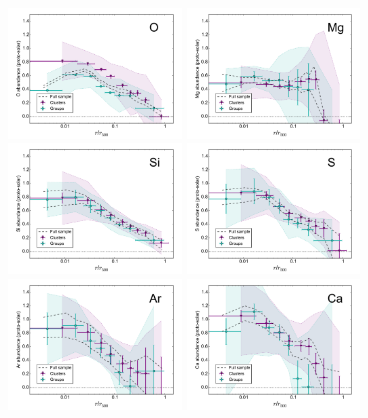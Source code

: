 \documentclass{aa}
\begin{document}
\begin{figure}[!]
        \centering
                \includegraphics[width=0.41\textwidth]{fig_radial_stacked_O_clgr.pdf}
                \includegraphics[width=0.41\textwidth]{fig_radial_stacked_Mg_clgr.pdf}
\\
                \includegraphics[width=0.41\textwidth]{fig_radial_stacked_Si_clgr.pdf}
                \includegraphics[width=0.41\textwidth]{fig_radial_stacked_S_clgr.pdf}
\\
                \includegraphics[width=0.41\textwidth]{fig_radial_stacked_Ar_clgr.pdf}
                \includegraphics[width=0.41\textwidth]{fig_radial_stacked_Ca_clgr.pdf}


\end{figure}
\end{document}
